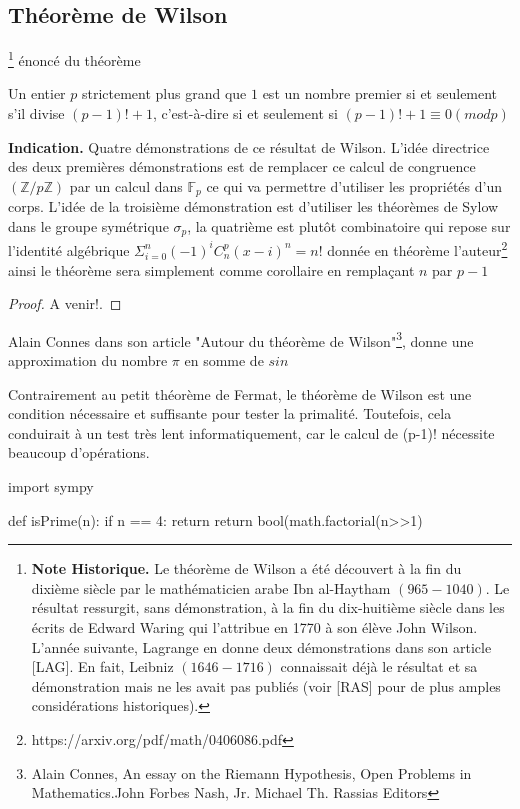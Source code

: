 \subsection{Théorème de Wilson}\footnote{\textbf{Note Historique.} Le théorème de Wilson a été découvert à la fin du dixième siècle par le mathématicien arabe Ibn al-Haytham $(965-1040)$. Le résultat ressurgit, sans démonstration, à la fin du dix-huitième siècle dans les écrits de Edward Waring qui l’attribue en 1770 à son élève John Wilson. L’année suivante, Lagrange en donne deux démonstrations dans son article [LAG]. En fait, Leibniz $(1646-1716)$ connaissait déjà le résultat et sa démonstration mais ne les avait pas publiés (voir [RAS] pour de plus amples considérations historiques).}
\'enoncé du théorème 
\begin{theorem}
 Un entier $p$ strictement plus grand que $1$ est un nombre premier si et seulement s'il divise $(p - 1)! + 1$, c'est-à-dire si et seulement si $(p-1)!+ 1 \equiv 0 (mod p)$
\end{theorem}
\textbf{Indication.}  Quatre démonstrations de ce résultat de Wilson. L'idée directrice des deux premières démonstrations est de remplacer ce calcul de congruence $(\mathbb{Z}/p\mathbb{Z})$ par un calcul dans $\mathbb{F}_{p}$ ce qui va permettre d'utiliser les propriétés d’un corps. L'idée de la troisième démonstration est d’utiliser les théorèmes de Sylow dans le groupe symétrique $\mathbb{\sigma}_{p}$, la quatrième est plutôt combinatoire qui repose sur l'identité algébrique $\Sigma_{i=0}^{n} (-1)^{i} C_n^{p}(x-i)^n = n!$ donnée en théorème l'auteur\footnote{https://arxiv.org/pdf/math/0406086.pdf} ainsi le théorème sera simplement comme
corollaire en remplaçant $n$ par $p-1$
\begin{proof}
A venir!.
\end{proof}
Alain Connes dans son article "Autour du théorème de Wilson"\footnote{Alain Connes, An essay on the Riemann Hypothesis, Open Problems in Mathematics.John Forbes Nash, Jr. Michael Th. Rassias Editors}, donne une approximation du nombre $\pi$ en somme de $sin$
\begin{remark}
Contrairement au petit théorème de Fermat, le théorème de Wilson est une condition nécessaire et suffisante pour tester la primalité. Toutefois, cela conduirait à un test très lent informatiquement, car le calcul de (p-1)! nécessite beaucoup d'opérations.
\end{remark}
\begin{python}
import sympy

def isPrime(n):
 if n == 4: return 
 return bool(math.factorial(n>>1)%
\end{python}
